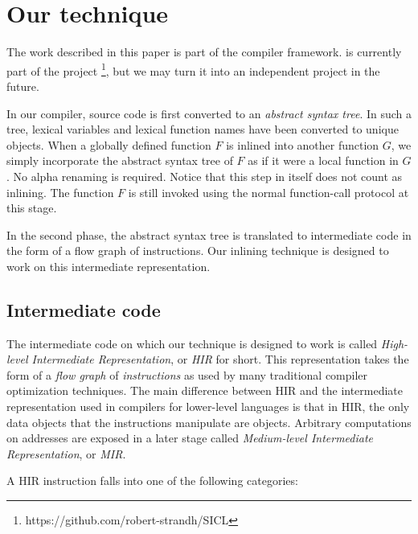 \section{Our technique}

The work described in this paper is part of the \cleavir{} compiler
framework.  \cleavir{} is currently part of the \sicl{} project%
\footnote{https://github.com/robert-strandh/SICL}, but we may turn it
into an independent project in the future.

In our compiler, source code is first converted to an \emph{abstract
  syntax tree}.  In such a tree, lexical variables and lexical
function names have been converted to unique objects.  When a globally
defined function $F$ is inlined into another function $G$, we simply
incorporate the abstract syntax tree of $F$ as if it were a local
function in $G$.  No alpha renaming is required.  Notice that this
step in itself does not count as inlining.  The function $F$ is still
invoked using the normal function-call protocol at this stage.

In the second phase, the abstract syntax tree is translated to
intermediate code in the form of a flow graph of instructions.  Our
inlining technique is designed to work on this intermediate
representation.

\subsection{Intermediate code}

The intermediate code on which our technique is designed to work is
called \emph{High-level Intermediate Representation}, or \emph{HIR}
for short.  This representation takes the form of a \emph{flow graph}
of \emph{instructions} as used by many traditional compiler
optimization techniques.  The main difference between HIR and the
intermediate representation used in compilers for lower-level
languages is that in HIR, the only data objects that the instructions
manipulate are \commonlisp{} objects.  Arbitrary computations on
addresses are exposed in a later stage called \emph{Medium-level
  Intermediate Representation}, or \emph{MIR}.

A HIR instruction falls into one of the following categories:

